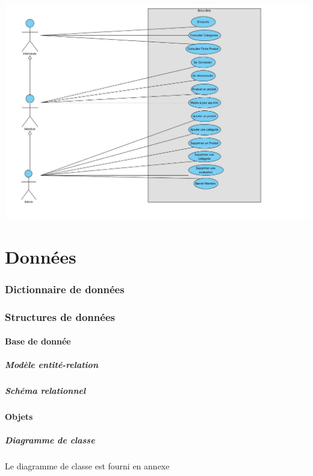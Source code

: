 \documentclass[10pt,a4paper]{article}
\begin{document}
				\includegraphics[scale=0.5]{cas/diagramme.jpg}
	\newpage			
	\part{Données}
		\section{Dictionnaire de données}
			
		\section{Structures de données}
			\subsection{Base de donnée}
				\subsubsection{Modèle entité-relation}
				\subsubsection{Schéma relationnel}
			\subsection{Objets}
				\subsubsection{Diagramme de classe}
					Le diagramme de classe est fourni en annexe
					\newline
					
\end{document}
